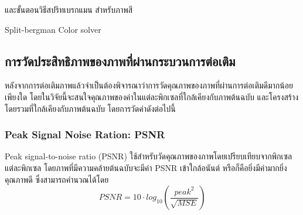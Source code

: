 \documentclass[hidelinks, a4paper,12pt]{article}
\numberwithin{equation}{section}							%
\numberwithin{equation}{section}
\begin{document}
{และขั้นตอนวิธีสปริทเบรกแมน สำหรับภาพสี
\begin{algorithm}[H]
	\caption{Split-bergman Color solver}
\end{algorithm}

\subsection{การวัดประสิทธิภาพของภาพที่ผ่านกระบวนการต่อเติม}
\hspace{1cm} หลังจากการต่อเติมภาพแล้วจำเป็นต้องพิจารณาว่าการวัดคุณภาพของภาพที่ผ่านการต่อเติมดีมากน้อยเพียงใด โดยในวิจัยนี้จะสนใจคุณภาพของค่าในแต่ละพิกเซลที่ใกล้เคียงกับภาพต้นฉบับ และโครงสร้างโดยรวมที่ใกล้เคียงกับภาพต้นฉบับ โดยการวัดค่าดังต่อไปนี้

\subsubsection{Peak Signal Noise Ration: PSNR}
\hspace{1cm}  Peak signal-to-noise ratio (PSNR) \cite{ref:PSNR} ใช้สำหรับวัดคุณภาพของภาพโดยเปรียบเทียบจากพิกเซลแต่ละพิกเซล โดยภาพที่มีความคล้ายต้นฉบับจะมีค่า PSNR เข้าใกล้อนันต์ หรือก็คือยิ่งมีค่ามากยิ่งคุณภาพดี ซึ่งสามารถคำนวณได้โดย
$$ PSNR = 10 \cdot log_{10} ( \frac{{peak}^2}{\sqrt{MSE}} )$$

}
\end{document}

